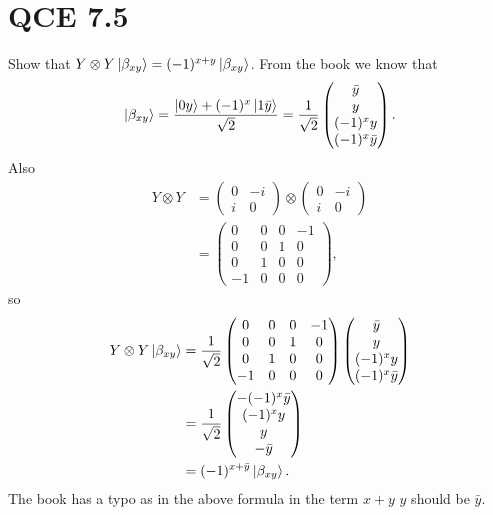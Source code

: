 \documentclass[10pt]{article}
\begin{document}
\section*{QCE 7.5}
Show that $Y \otimes Y \ket{\beta_{xy}} = (-1)^{x + y} \ket{\beta_{xy}}$.
From the book we know that 
\[
\ket{\beta_{xy}} = \frac{\ket{0y} + (-1)^x\ket{1\bar{y}}}{\sqrt{2}} 
= 
\frac{1}{\sqrt{2}}
\begin{pmatrix}
\bar{y} \\
y \\
(-1)^x y \\
(-1)^x \bar{y}
\end{pmatrix}.
\]
Also 
\begin{align*}
Y \otimes Y &= 
\begin{pmatrix}
0 & -i \\
i & 0
\end{pmatrix}
\otimes 
\begin{pmatrix}
0 & -i \\
i & 0
\end{pmatrix} \\
&= \begin{pmatrix}
0 & 0 & 0 & -1 \\
0 & 0 & 1 & 0 \\
0 & 1 & 0 & 0 \\
-1 & 0 & 0 & 0
\end{pmatrix},
\end{align*}
so
\begin{align*}
Y \otimes Y \ket{\beta_{xy}} &= 
		\frac{1}{\sqrt{2}}
		\begin{pmatrix}
        0 & 0 & 0 & -1 \\
        0 & 0 & 1 & 0 \\
        0 & 1 & 0 & 0 \\
        -1 & 0 & 0 & 0
		\end{pmatrix}
		\begin{pmatrix}
        \bar{y} \\
        y \\
        (-1)^x y \\
        (-1)^x \bar{y} \\
\end{pmatrix} \\
&= \frac{1}{\sqrt{2}}
\begin{pmatrix}
        -(-1)^x \bar{y} \\
        (-1)^x y \\
        y \\
        -\bar{y} \\
\end{pmatrix} \\
&= (-1)^{x + \bar{y}} \ket{\beta_{xy}}.
\end{align*}
The book has a typo as in the above formula in the term $x + y$ $y$ should be $\bar{y}$.
\end{document}
